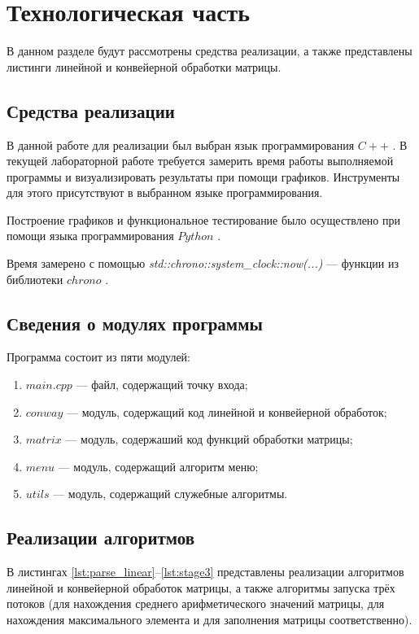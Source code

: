 \chapter{Технологическая часть}

В данном разделе будут рассмотрены средства реализации, а также представлены листинги линейной и конвейерной обработки матрицы.


\section{Средства реализации}
В данной работе для реализации был выбран язык программирования $C++$ \cite{cpp-lang}. В текущей лабораторной работе требуется замерить время работы выполняемой программы
и визуализировать результаты при помощи графиков. Инструменты для этого присутствуют в выбранном языке программирования.

Построение графиков и функциональное тестирование было осуществлено при помощи языка программирования $Python$ \cite{python-lang}.

Время замерено с помощью \textit{std::chrono::system\_clock::now(...)} --- функции из библиотеки $chrono$ \cite{cpp-lang-chrono}.


\section{Сведения о модулях программы}
Программа состоит из пяти модулей:
\begin{enumerate}[label=\arabic*)]
	\item $main.cpp$ --- файл, содержащий точку входа;
	\item $conway$ --- модуль, содержащий код линейной и конвейерной обработок;
	\item $matrix$ --- модуль, содержаший код функций обработки матрицы;
	\item $menu$ --- модуль, содержащий алгоритм меню;
	\item $utils$ --- модуль, содержащий служебные алгоритмы. 
\end{enumerate}


\section{Реализации алгоритмов}

В листингах \ref{lst:parse_linear}--\ref{lst:stage3} представлены реализации алгоритмов линейной и конвейерной обработок матрицы, а также алгоритмы запуска трёх потоков (для нахождения среднего арифметического значений матрицы, для нахождения максимального элемента и для заполнения матрицы соответственно).

